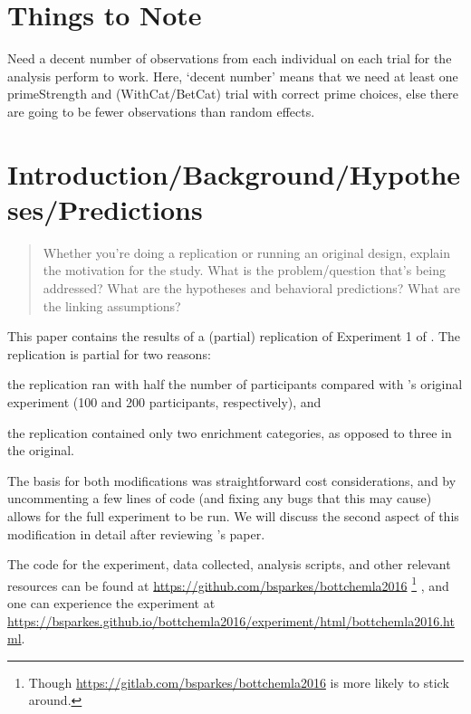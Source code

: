 \documentclass[10pt]{article}
\begin{document}
\maketitle

\begin{multicols}{2}

  \section{Things to Note}
\label{sec:things-note}

Need a decent number of observations from each individual on each trial for the analysis \citeauthor{Bott:2016aa} perform to work.
Here, `decent number' means that we need at least one primeStrength and (WithCat/BetCat) trial with correct prime choices, else there are going to be fewer observations than random effects.

\section{Introduction/Background/Hypotheses/Predictions}
\label{sec:introduction}

\begin{quote}
  Whether you're doing a replication or running an original design, explain the motivation for the study.
  What is the problem/question that's being addressed?
  What are the hypotheses and behavioral predictions?
  What are the linking assumptions?
\end{quote}

This paper contains the results of a (partial) replication of Experiment 1 of \textcite{Bott:2016aa}.
The replication is partial for two reasons:
\begin{enumerate*}[label=\arabic*)]
\item the replication ran with half the number of participants compared with \citeauthor{Bott:2016aa}'s original experiment (100 and 200 participants, respectively), and
\item the replication contained only two enrichment categories, as opposed to three in the original.
\end{enumerate*}
The basis for both modifications was straightforward cost considerations, and by uncommenting a few lines of code (and fixing any bugs that this may cause) allows for the full experiment to be run.
We will discuss the second aspect of this modification in detail after reviewing \citeauthor{Bott:2016aa}'s paper.

The code for the experiment, data collected, analysis scripts, and other relevant resources can be found at \url{https://github.com/bsparkes/bottchemla2016}\nolinebreak
\footnote{Though \url{https://gitlab.com/bsparkes/bottchemla2016} is more likely to stick around.}\nolinebreak
, and one can experience the experiment at \url{https://bsparkes.github.io/bottchemla2016/experiment/html/bottchemla2016.html}.







\end{multicols}
\end{document}
